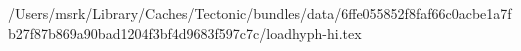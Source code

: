 /Users/msrk/Library/Caches/Tectonic/bundles/data/6ffe055852f8faf66c0acbe1a7fb27f87b869a90bad1204f3bf4d9683f597c7c/loadhyph-hi.tex